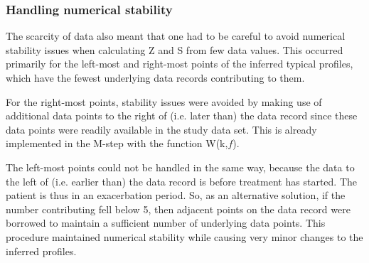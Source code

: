 \subsubsection{Handling numerical stability} \label{sec:numstability}
The scarcity of data also meant that one had to be careful to avoid numerical stability issues when calculating Z and S from few data values. This occurred primarily for the left-most and right-most points of the inferred typical profiles, which have the fewest underlying data records contributing to them. 

For the right-most points, stability issues were avoided by making use of additional data points to the right of (i.e. later than) the data record since these data points were readily available in the study data set. This is already implemented in the M-step with the function W(k,$f$).

The left-most points could not be handled in the same way, because the data to the left of (i.e. earlier than) the data record is before treatment has started. The patient is thus in an exacerbation period. So, as an alternative solution, if the number contributing fell below 5, then adjacent points on the data record were borrowed to maintain a sufficient number of underlying data points. This procedure maintained numerical stability while causing very minor changes to the inferred profiles.


